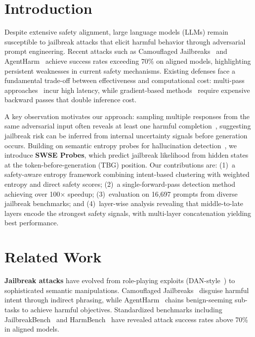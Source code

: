 \documentclass[10pt]{cai}
\begin{document}
\section{Introduction}

Despite extensive safety alignment, large language models (LLMs) remain susceptible to jailbreak attacks that elicit harmful behavior through adversarial prompt engineering. Recent attacks such as Camouflaged Jailbreaks~\cite{camouflaged2024} and AgentHarm~\cite{agentharm2024} achieve success rates exceeding 70\% on aligned models, highlighting persistent weaknesses in current safety mechanisms. Existing defenses face a fundamental trade-off between effectiveness and computational cost: multi-pass approaches~\cite{semanticsmooth2024, safedecoding2024} incur high latency, while gradient-based methods~\cite{gradientcuff2024} require expensive backward passes that double inference cost.

A key observation motivates our approach: sampling multiple responses from the same adversarial input often reveals at least one harmful completion~\cite{bestofn2024}, suggesting jailbreak risk can be inferred from internal uncertainty signals before generation occurs. Building on semantic entropy probes for hallucination detection~\cite{kuhn2023semantic, sep2024}, we introduce \textbf{SWSE Probes}, which predict jailbreak likelihood from hidden states at the token-before-generation (TBG) position. Our contributions are: (1)~a safety-aware entropy framework combining intent-based clustering with weighted entropy and direct safety scores; (2)~a single-forward-pass detection method achieving over 100$\times$ speedup; (3)~evaluation on 16,697 prompts from diverse jailbreak benchmarks; and (4)~layer-wise analysis revealing that middle-to-late layers encode the strongest safety signals, with multi-layer concatenation yielding best performance.


\section{Related Work}

\textbf{Jailbreak attacks} have evolved from role-playing exploits (DAN-style~\cite{dan2023}) to sophisticated semantic manipulations. Camouflaged Jailbreaks~\cite{camouflaged2024} disguise harmful intent through indirect phrasing, while AgentHarm~\cite{agentharm2024} chains benign-seeming sub-tasks to achieve harmful objectives. Standardized benchmarks including JailbreakBench~\cite{jailbreakbench2024} and HarmBench~\cite{harmbench2024} have revealed attack success rates above 70\% in aligned models.
\end{document}
